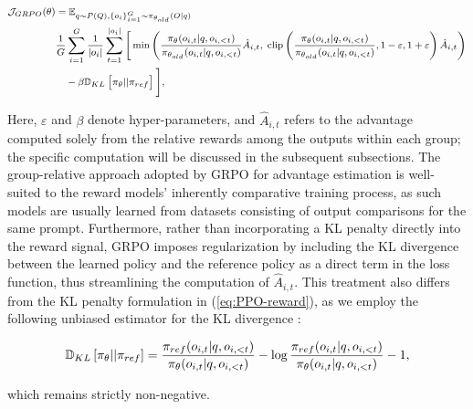 \begin{itemize}[topsep=0pt]
\begin{equation}
\footnotesize
\begin{split}
    \mathcal{J}_{GRPO}(\theta) &= \mathbb{E}_{q \sim P(Q), \{o_i\}_{i=1}^G \sim \pi_{\theta_{old}}(O|q)}  \\
    & \frac{1}{G}\sum_{i=1}^G\frac{1}{|o_i|} \sum_{t=1}^{|o_i|} \Bigg[ \min \left( \frac{\pi_\theta(o_{i,t} | q, o_{i,<t})}{\pi_{\theta_{old}}(o_{i,t} | q, o_{i,<t})} \hat{A}_{i,t},\; \text{clip} \left( \frac{\pi_\theta(o_{i,t} | q, o_{i,<t})}{\pi_{\theta_{old}}(o_{i,t} | q, o_{i,<t})}, 1 - \varepsilon, 1 + \varepsilon \right)  \hat{A}_{i,t} \right) \\
    &\quad - \beta \mathbb{D}_{KL}\left[\pi_{\theta} || \pi_{ref}\right] \Bigg] ,
\end{split}
\label{eq:GRPO-obj}
\end{equation}

Here, $\varepsilon$ and $\beta$ denote hyper-parameters, and $\hat{A}_{i,t}$ refers to the advantage computed solely from the relative rewards among the outputs within each group; the specific computation will be discussed in the subsequent subsections. The group-relative approach adopted by GRPO for advantage estimation is well-suited to the reward models’ inherently comparative training process, as such models are usually learned from datasets consisting of output comparisons for the same prompt. Furthermore, rather than incorporating a KL penalty directly into the reward signal, GRPO imposes regularization by including the KL divergence between the learned policy and the reference policy as a direct term in the loss function, thus streamlining the computation of $\hat{A}_{i,t}$. This treatment also differs from the KL penalty formulation in (\ref{eq:PPO-reward}), as we employ the following unbiased estimator for the KL divergence \citep{kl_approx}:

\begin{equation}
\small
    \mathbb{D}_{KL}\left[\pi_{\theta} || \pi_{ref}\right] = \frac{\pi_{ref}(o_{i,t}|q,o_{i,<t})}{\pi_{\theta}(o_{i,t}|q,o_{i,<t})}- \log\frac{\pi_{ref}(o_{i,t}|q,o_{i,<t})}{\pi_{\theta}(o_{i,t}|q,o_{i,<t})} - 1,
\end{equation}

which remains strictly non-negative.


\end{itemize}
